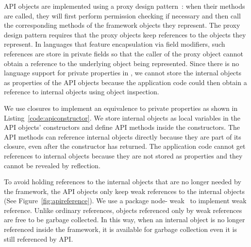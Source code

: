 API objects are implemented using a proxy design pattern~\cite{GangOfFour}:  
when their methods are
called, they will first perform permission checking if necessary and then call
the corresponding methods of the framework objects they represent. The proxy
design pattern requires that the proxy objects keep references to the objects they
represent. In languages that feature encapsulation via field modifiers, such 
references are store in private fields so
that the caller of the proxy object cannot obtain a reference to the 
underlying object being represented. Since there is no language support for private
properties in \js, we cannot  store the internal objects as properties of the
API objects because the application code could then obtain a reference to internal
objects using object inspection. 

We use closures to implement an equivalence to private properties as
shown in Listing~\ref{code:apiconstructor}. We store internal objects as local
variables in the API objects' constructors and define API methods inside the
constructors. The API methods can reference internal objects
directly because they are part of its closure, even after the constructor has returned.
The application code cannot get references to internal objects because they 
are not stored as properties and they cannot be revealed by reflection.


To avoid holding references to the internal objects that are no longer needed
by the framework, the API objects only keep weak references to the internal
objects (See Figure~\ref{fig:apireference}). We use a \nodejs{} package node-
weak~\cite{nodeweak} to implement weak reference. Unlike ordinary references,
objects referenced only by weak references are free to be garbage
collected.
In this way, when an internal object is no longer referenced
inside the framework, it is available for garbage collection even 
it is still referenced by API.

